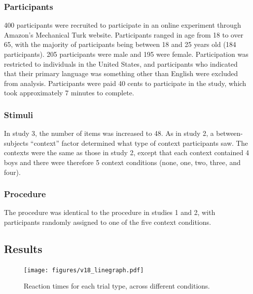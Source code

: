 \documentclass[man]{apa2}
\begin{document}
\subsubsection{Participants}
400 participants were recruited to participate in an online experiment through Amazon's Mechanical Turk website.  Participants ranged in age from 18 to over 65, with the majority of participants being between 18 and 25 years old (184 participants).  205 participants were male and 195 were female.  Participation was restricted to individuals in the United States, and participants who indicated that their primary language was something other than English were excluded from analysis.  Participants were paid 40 cents to participate in the study, which took approximately 7 minutes to complete.  

\subsubsection{Stimuli}
In study 3, the number of items was increased to 48.  As in study 2, a between-subjects ``context'' factor determined what type of context participants saw.  The contexts were the same as those in study 2, except that each context contained 4 boys and there were therefore 5 context conditions (none, one, two, three, and four).  

\subsubsection{Procedure}
 The procedure was identical to the procedure in studies 1 and 2, with participants randomly assigned to one of the five context conditions.
 
\subsection{Results}

\begin{figure}
\begin{center} 
\texttt{[image: figures/v18\_linegraph.pdf]}
\caption{\label{fig:addition_subs} Reaction times for each trial type, across different conditions.}
\end{center} 
\end{figure}
\end{document}
